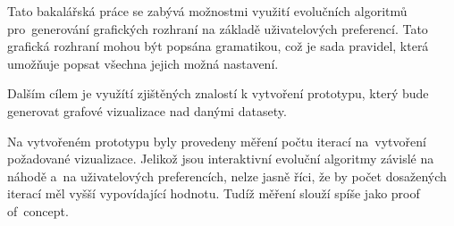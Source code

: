 Tato bakalářská práce se zabývá možnostmi využití evolučních algoritmů pro~generování grafických rozhraní na základě uživatelových preferencí. Tato grafická rozhraní mohou být popsána gramatikou, což je sada pravidel, která umožňuje popsat všechna jejich možná nastavení.

Dalším cílem je využítí zjištěných znalostí k vytvoření prototypu, který bude generovat grafové vizualizace nad danými datasety.

Na vytvořeném prototypu byly provedeny měření počtu iterací na~vytvoření požadované vizualizace. Jelikož jsou interaktivní evoluční algoritmy závislé na náhodě a~na uživatelových preferencích, nelze jasně říci, že by počet dosažených iterací měl vyšší vypovídající hodnotu. Tudíž měření slouží spíše jako proof of~concept.
